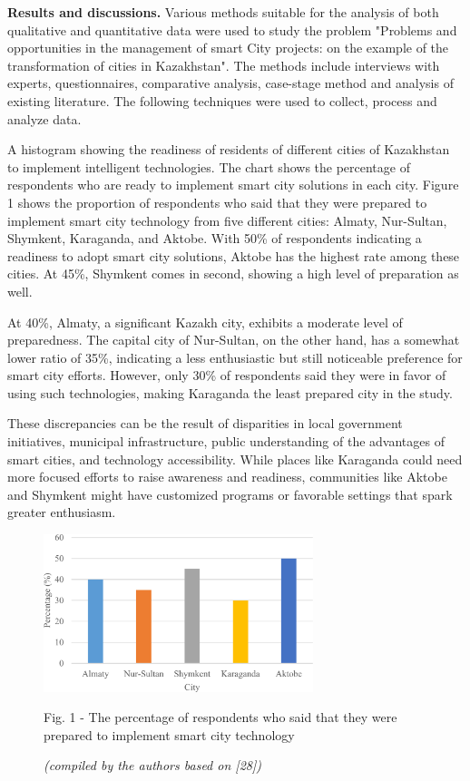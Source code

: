 \begin{multicols}{2}
{\bfseries Results and discussions.} Various methods suitable for the
analysis of both qualitative and quantitative data were used to study
the problem "Problems and opportunities in the management of smart City
projects: on the example of the transformation of cities in Kazakhstan".
The methods include interviews with experts, questionnaires, comparative
analysis, case-stage method and analysis of existing literature. The
following techniques were used to collect, process and analyze data.

A histogram showing the readiness of residents of different cities of
Kazakhstan to implement intelligent technologies. The chart shows the
percentage of respondents who are ready to implement smart city
solutions in each city. Figure 1 shows the proportion of respondents who
said that they were prepared to implement smart city technology from
five different cities: Almaty, Nur-Sultan, Shymkent, Karaganda, and
Aktobe. With 50\% of respondents indicating a readiness to adopt smart
city solutions, Aktobe has the highest rate among these cities. At 45\%,
Shymkent comes in second, showing a high level of preparation as well.

At 40\%, Almaty, a significant Kazakh city, exhibits a moderate level of
preparedness. The capital city of Nur-Sultan, on the other hand, has a
somewhat lower ratio of 35\%, indicating a less enthusiastic but still
noticeable preference for smart city efforts. However, only 30\% of
respondents said they were in favor of using such technologies, making
Karaganda the least prepared city in the study.

These discrepancies can be the result of disparities in local government
initiatives, municipal infrastructure, public understanding of the
advantages of smart cities, and technology accessibility. While places
like Karaganda could need more focused efforts to raise awareness and
readiness, communities like Aktobe and Shymkent might have customized
programs or favorable settings that spark greater enthusiasm.
\end{multicols}

\begin{figure}[H]
	\centering
	\includegraphics[width=0.7\textwidth]{media/ekon/Graph_12}
	\caption*{Fig. 1 - The percentage of respondents who said that they were prepared to implement smart city technology}
	\caption*{\normalfont \emph{(compiled by the authors based on {[}28{]})}}
\end{figure}

